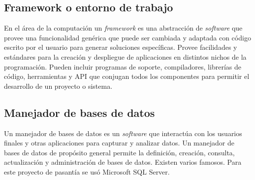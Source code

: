 \subsection{Framework o entorno de trabajo} 

En el área de la computación un \emph{framework} es una abstracción de \emph{software} que provee una funcionalidad genérica que puede ser cambiada y adaptada con código escrito por el usuario para generar soluciones específicas. Provee facilidades y estándares para la creación y despliegue de aplicaciones en distintos nichos de la programación. Pueden incluir programas de soporte, compiladores, librerías de código, herramientas y \gls{API} que conjugan todos los componentes para permitir el desarrollo de un proyecto o sistema\cite{bib:framework}.

\subsection{Manejador de bases de datos} 

Un manejador de bases de datos es un \emph{software} que interactúa con los usuarios finales y otras aplicaciones para capturar y analizar datos. Un manejador de bases de datos de propósito general permite la definición, creación, consulta, actualización y administración de bases de datos. Existen varios famosos. Para este proyecto de pasantía se usó Microsoft \gls{SQL} Server\cite{bib:dbms}.